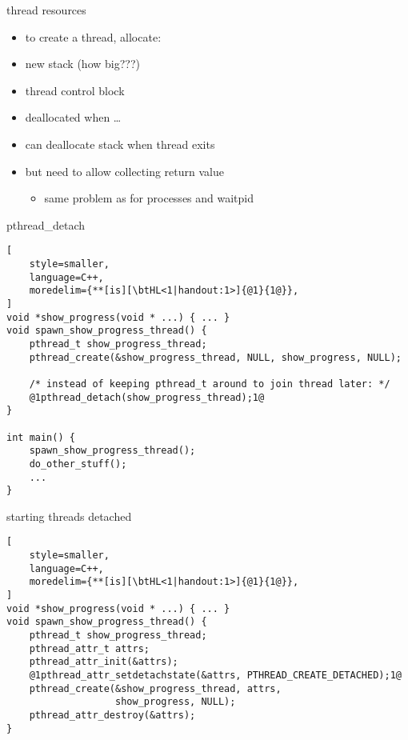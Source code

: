 \begin{frame}{thread resources}
\begin{itemize}
\item to create a thread, allocate:
\item new stack (how big???)
\item thread control block
\vspace{.5cm}
\item deallocated when \ldots
\item<2-> can deallocate stack when thread exits
\item<2-> but need to allow collecting return value
    \begin{itemize}
    \item same problem as for processes and waitpid
    \end{itemize}
\end{itemize}
\end{frame}

\begin{frame}[fragile,label=pthreadDetach]{pthread\_detach}
\begin{lstlisting}[
    style=smaller,
    language=C++,
    moredelim={**[is][\btHL<1|handout:1>]{@1}{1@}},
]
void *show_progress(void * ...) { ... }
void spawn_show_progress_thread() {
    pthread_t show_progress_thread;
    pthread_create(&show_progress_thread, NULL, show_progress, NULL);

    /* instead of keeping pthread_t around to join thread later: */
    @1pthread_detach(show_progress_thread);1@
}

int main() {
    spawn_show_progress_thread();
    do_other_stuff();
    ...
}
\end{lstlisting}
\end{frame}

\begin{frame}[fragile,label=startThreadDetached]{starting threads detached}
\begin{lstlisting}[
    style=smaller,
    language=C++,
    moredelim={**[is][\btHL<1|handout:1>]{@1}{1@}},
]
void *show_progress(void * ...) { ... }
void spawn_show_progress_thread() {
    pthread_t show_progress_thread;
    pthread_attr_t attrs;
    pthread_attr_init(&attrs);
    @1pthread_attr_setdetachstate(&attrs, PTHREAD_CREATE_DETACHED);1@
    pthread_create(&show_progress_thread, attrs,
                   show_progress, NULL);
    pthread_attr_destroy(&attrs);
}
\end{lstlisting}
\end{frame}

